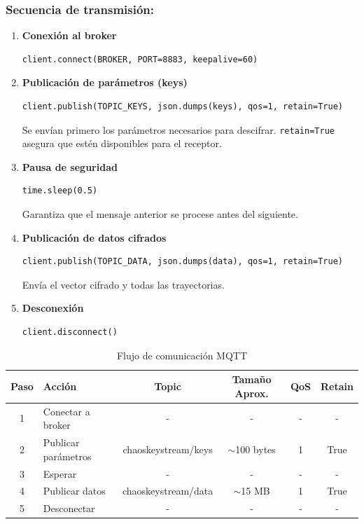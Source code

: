 \documentclass[12pt,a4paper]{article}
\begin{document}
\subsubsection*{Secuencia de transmisión:}

\begin{enumerate}
    \item \textbf{Conexión al broker}
    \begin{lstlisting}
client.connect(BROKER, PORT=8883, keepalive=60)
    \end{lstlisting}
    
    \item \textbf{Publicación de parámetros (keys)}
    \begin{lstlisting}
client.publish(TOPIC_KEYS, json.dumps(keys), qos=1, retain=True)
    \end{lstlisting}
    Se envían primero los parámetros necesarios para descifrar. \texttt{retain=True} asegura que estén disponibles para el receptor.
    
    \item \textbf{Pausa de seguridad}
    \begin{lstlisting}
time.sleep(0.5)
    \end{lstlisting}
    Garantiza que el mensaje anterior se procese antes del siguiente.
    
    \item \textbf{Publicación de datos cifrados}
    \begin{lstlisting}
client.publish(TOPIC_DATA, json.dumps(data), qos=1, retain=True)
    \end{lstlisting}
    Envía el vector cifrado y todas las trayectorias.
    
    \item \textbf{Desconexión}
    \begin{lstlisting}
client.disconnect()
    \end{lstlisting}
\end{enumerate}

\begin{table}[H]
\centering
\caption{Flujo de comunicación MQTT}
\label{tab:mqtt_flow}
\begin{tabular}{@{}clcccc@{}}
\toprule
\textbf{Paso} & \textbf{Acción} & \textbf{Topic} & \textbf{Tamaño Aprox.} & \textbf{QoS} & \textbf{Retain} \\ \midrule
1 & Conectar a broker & - & - & - & - \\
2 & Publicar parámetros & chaoskeystream/keys & $\sim$100 bytes & 1 & True \\
3 & Esperar & - & - & - & - \\
4 & Publicar datos & chaoskeystream/data & $\sim$15 MB & 1 & True \\
5 & Desconectar & - & - & - & - \\ \bottomrule
\end{tabular}
\end{table}
\end{document}
